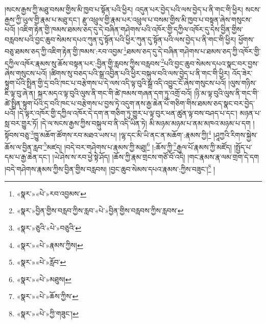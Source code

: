 །སངས་རྒྱས་ཀྱི་མཐུ་བསམ་གྱིས་མི་ཁྱབ་པ་སྟོན་པའི་ཕྱིར། འདུན་པར་བྱེད་པའི་ལས་བྱེད་པ་ནི་གང་གི་ཕྱིར། སངས་རྒྱས་ཀྱི་ཡུལ་གྱི་རྣམ་པ་མཐུ་དང་། རྫུ་འཕྲུལ་གྱི་རྣམ་པར་འཕྲུལ་པ་བསམ་གྱིས་མི་ཁྱབ་པ་བསྟན་ཞེས་གསུངས་པའོ། །འཇིག་རྟེན་གྱི་ཁམས་ཐམས་ཅད་དུ་དེ་བཞིན་གཤེགས་པའི་འཁོར་གྱི་དཀྱིལ་འཁོར་དུ་དེས་བྱིན་གྱིས་བརླབས་པའི་བྱང་ཆུབ་སེམས་དཔའ་ཀུན་དུ་སྟོན་པའི་ཕྱིར་ཀུན་དུ་སྟོན་པའི་ལས་བྱེད་པ་ནི་གང་གི་ཕྱིར། ཕྱོགས་བཅུ་ཐམས་ཅད་ཀྱི་འཇིག་རྟེན་གྱི་ཁམས་:རབ་འབྱམ་\footnote{«སྣར་»«པེ་»རབ་འབྱམས་}ཐམས་ཅད་དུ་དེ་བཞིན་གཤེགས་པ་ཐམས་ཅད་ཀྱི་འཁོར་གྱི་དཀྱིལ་འཁོར་རྣམས་སུ་ཆོས་བསྟན་པར་:བྱིན་གྱི་རླབས་ཀྱིས་བརླབས་\footnote{«སྣར་»བྱིན་གྱིས་བརླབ་ཀྱིས་རླབ་«པེ་»བྱིན་གྱིས་བརླབས་ཀྱིས་རླབས་}པའི་བྱང་ཆུབ་སེམས་དཔའ་སྣང་བར་བྱས་ཞེས་གསུངས་པའོ། །ཚིགས་སུ་བཅད་པའི་སྒྲ་འབྱིན་པའི་ཕྱིར་བསྐུལ་བའི་ལས་བྱེད་པ་ནི་གང་གི་ཕྱིར། འོད་ཟེར་སྟུག་པོའི་སྤྲིན་གྱི་དྲ་བའི་ཁང་པ་བརྩེགས་པ་དེ་ལས་འདི་ལྟ་བུའི་སྒྲ་འདི་འབྱུང་ངོ་ཞེས་གསུངས་པའོ། །ལུས་གཉིས་ཇི་ལྟ་བུ་ཞེ་ན། སྐར་མདའ་ལྟ་བུའི་ལུས་ནི་གང་གི་ཚེ་ཁམས་གཞན་དག་ཏུ་འགྲོ་བའོ། །ཉི་མ་ལྟ་བུའི་ལུས་ནི་གང་གི་ཚེ་སྤྲིན་སྟུག་པོའི་དྲ་བའི་ཁང་པ་བརྩེགས་པ་བྱས་ཏེ་འདུག་ནས་རྒྱ་ཆེན་པོ་གཅིག་གིས་ཐམས་ཅད་སྣང་བར་བྱེད་པའོ། །དེ་ལྟར་འཁོར་གྱི་དཀྱིལ་འཁོར་དེ་དག་ན་གཅིག་ཏུ་གྱུར་པ་ལྟ་བུར་ཕན་ཚུན་ལྟ་བས་བཤད་པ་དང་། མཉན་པ་སླ་བར་གྱུར་ཏོ། །དེ་ལ་སངས་རྒྱས་ཀྱིས་བསྐུལ་བ་ནི་འདི་ཡིན་ཏེ། མི་མཉམ་མཉམ་པ་ནམ་མཁའ་མཉམ་པ་དག །སྟོབས་བཅུ་\footnote{«སྣར་»ཅུའི་«པེ་»བཅུའི་}ཁྱུ་མཆོག་ཚོགས་རབ་མཐའ་ཡས་པ། །ལྷ་དང་མི་ཡི་ནང་ན་མཆོག་:རྣམས་ཀྱི།\footnote{«སྣར་»«པེ་»རྣམས་ཀྱིས།} །ཤཱཀྱའི་རིགས་སྐྱེས་ཆོས་ལ་བྱིན་རླབ་\footnote{«སྣར་»«པེ་»རློབ་}མཛད། །བདེ་བར་གཤེགས་པ་རྣམས་ཀྱི་མཐུ།\footnote{«སྣར་»«པེ་»མཐུས།} །:ཆོས་ཀྱི་\footnote{«སྣར་»«པེ་»ཆོས་ཀྱིས་}རྒྱལ་པོ་རྣམས་ཀྱི་མཛོད། །སྤྱོད་པ་དམ་པ་རྒྱ་ཆེན་དང་། །ཡེ་ཤེས་ས་རབ་ཕྱེ་སྟེ་ཤོད། །ཆོས་ཀྱི་རྣམ་གྲངས་གཙོ་བོ་འདི། །གང་རྣམས་རྣ་ལམ་གྲག་དེ་དག །བདེ་གཤེགས་རྣམས་ཀྱིས་བྱིན་གྱིས་བརླབས། །བྱང་ཆུབ་སེམས་དཔའ་རྣམས་:ཀྱིས་བཟུང་།\footnote{«སྣར་»«པེ་»ཀྱི་གཟུང་།} །
